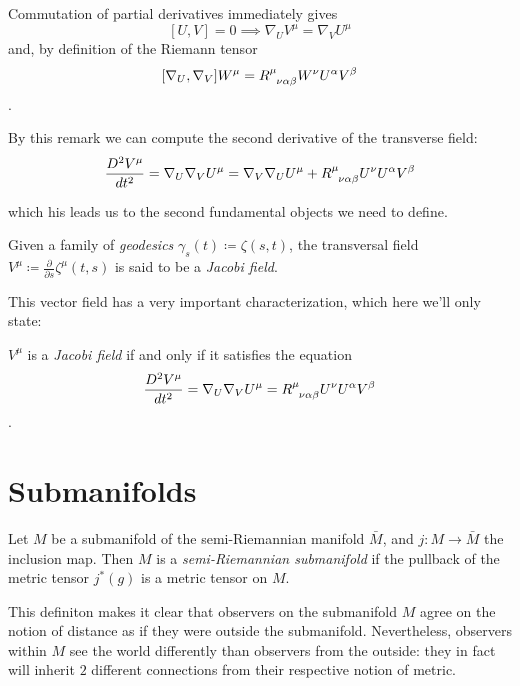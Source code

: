

\begin{remark}
	Commutation of partial derivatives immediately gives 
	\[
	[U, V] = 0 \implies \nabla_U V^{\mu} = \nabla_V U^{\mu}
	\]
	and, by definition of the Riemann tensor
	\[
	[\nabla_U, \nabla_V]W^{\mu} = R\indices{^{\mu}_{\nu\alpha\beta}}W^{\nu}U^{\alpha}V^{\beta}
	\].
\end{remark}

By this remark we can compute the second derivative of the transverse field:
\[
\frac{D^2\tensor{V}{^\mu} }{dt^2} = \nabla_U\nabla_V U^{\mu} = \nabla_V\nabla_U U^{\mu} + R\indices{^{\mu}_{\nu\alpha\beta}}U^{\nu}U^{\alpha}V^{\beta}
\]

which his leads us to the second fundamental objects we need to define. 
\begin{definition}
	Given a family of \emph{geodesics} \(\gamma_s(t) \coloneqq \zeta(s,t)\), the transversal field \(V^{\mu} \coloneqq \frac{\partial}{\partial s} \zeta^{\mu}(t,s)\) is said to be a \emph{Jacobi field}.
\end{definition}

This vector field has a very important characterization, which here we'll only state:
\begin{lemma}
\(V^{\mu}\) is a \emph{Jacobi field} if and only if it satisfies the equation
	\[
	\frac{D^2\tensor{V}{^\mu} }{dt^2} = \nabla_U\nabla_V U^{\mu} =  R\indices{^{\mu}_{\nu\alpha\beta}}U^{\nu}U^{\alpha}V^{\beta}
	\].
\end{lemma}


\section{Submanifolds}
\label{sec:submanifolds}

\begin{definition}
	Let \(M\) be a submanifold of the semi-Riemannian manifold \(\bar{M}\), and \(j:M\rightarrow\bar{M}\) the inclusion map. Then \(M\) is a \emph{semi-Riemannian submanifold} if the pullback of the metric tensor \(j^*(g)\) is a metric tensor on \(M\).
\end{definition}

This definiton makes it clear that observers on the submanifold \(M\) agree on the notion of distance as if they were outside the submanifold. Nevertheless, observers within \(M\) see the world differently than observers from the outside: they in fact will inherit \(2\) different connections from their respective notion of metric. 

